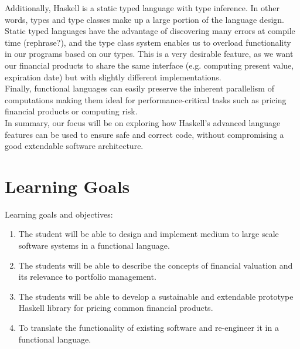 \documentclass[11pt]{article}
\begin{document}
Additionally, Haskell is a static typed language with type inference. In other words, 
types and type classes make up a large portion of the language design. Static typed languages have the
advantage of discovering many errors at compile time (rephrase?), and the type class system enables us to overload
functionality in our programs based on our types. This is a very desirable feature, as we want our financial products
to share the same interface (e.g. computing present value, expiration date) but with slightly different implementations.\\

Finally, functional languages can easily preserve the inherent parallelism of computations 
making them ideal for performance-critical tasks such as pricing financial products or
computing risk.\\

In summary, our focus will be on exploring how Haskell's advanced language features can be used
to ensure safe and correct code, without compromising a good extendable software architecture.


\section*{Learning Goals}

Learning goals and objectives:

\begin{enumerate}
\item The student will be able to design and implement medium to large scale software systems in a functional language. %
\item The students will be able to describe the concepts of financial valuation and its relevance to portfolio management. %
\item The students will be able to develop a sustainable and extendable prototype Haskell library for pricing common financial products. %
\item To translate the functionality of existing software and re-engineer it in a functional language.
\end{enumerate}
\end{document}
